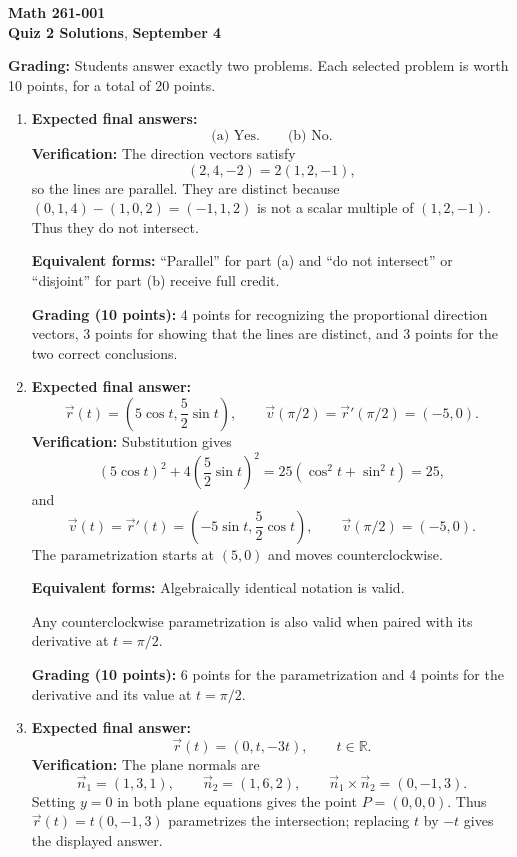 \documentclass[12pt]{exam}
\newcommand{\class}{Math 261-001}
\newcommand{\examnum}{Quiz 2 Solutions}
\newcommand{\examdate}{September 4}
\begin{document}
\pagestyle{plain}
\thispagestyle{empty}

\noindent
\textbf{\class}\\
\textbf{\examnum}, \textbf{\examdate}

\vspace{10pt}
\textbf{Grading:} Students answer exactly two problems. Each selected problem
is worth 10 points, for a total of 20 points.

\small
\begin{enumerate}

\item \textbf{Expected final answers:}
\[
  \text{(a) Yes.}\qquad \text{(b) No.}
\]
\textbf{Verification:} The direction vectors satisfy
\[
  (2,4,-2)=2(1,2,-1),
\]
so the lines are parallel. They are distinct because
$(0,1,4)-(1,0,2)=(-1,1,2)$ is not a scalar multiple of $(1,2,-1)$.
Thus they do not intersect.

\textbf{Equivalent forms:} ``Parallel'' for part (a) and ``do not intersect''
or ``disjoint'' for part (b) receive full credit.

\textbf{Grading (10 points):} 4 points for recognizing the proportional
direction vectors, 3 points for showing that the lines are distinct, and
3 points for the two correct conclusions.

\item \textbf{Expected final answer:}
\[
  \vec{r}(t)=\left(5\cos t,\frac{5}{2}\sin t\right),\qquad
  \vec{v}(\pi/2)=\vec{r}'(\pi/2)=(-5,0).
\]
\textbf{Verification:} Substitution gives
\[
  (5\cos t)^2+4\left(\frac{5}{2}\sin t\right)^2
  =25(\cos^2t+\sin^2t)=25,
\]
and
\[
  \vec{v}(t)=\vec{r}'(t)
  =\left(-5\sin t,\frac{5}{2}\cos t\right),\qquad
  \vec{v}(\pi/2)=(-5,0).
\]
The parametrization starts at $(5,0)$ and moves counterclockwise.

\textbf{Equivalent forms:} Algebraically identical notation is valid.\par
Any counterclockwise parametrization is also valid when paired with its
derivative at $t=\pi/2$.

\textbf{Grading (10 points):} 6 points for the parametrization and 4 points
for the derivative and its value at $t=\pi/2$.

\item \textbf{Expected final answer:}
\[
  \vec{r}(t)=(0,t,-3t),\qquad t\in\mathbb{R}.
\]
\textbf{Verification:} The plane normals are
\[
  \vec{n}_1=(1,3,1),\qquad \vec{n}_2=(1,6,2),\qquad
  \vec{n}_1\times\vec{n}_2=(0,-1,3).
\]
Setting $y=0$ in both plane equations gives the point $P=(0,0,0)$.
Thus $\vec{r}(t)=t(0,-1,3)$ parametrizes the intersection; replacing $t$ by
$-t$ gives the displayed answer.


\end{enumerate}
\end{document}
